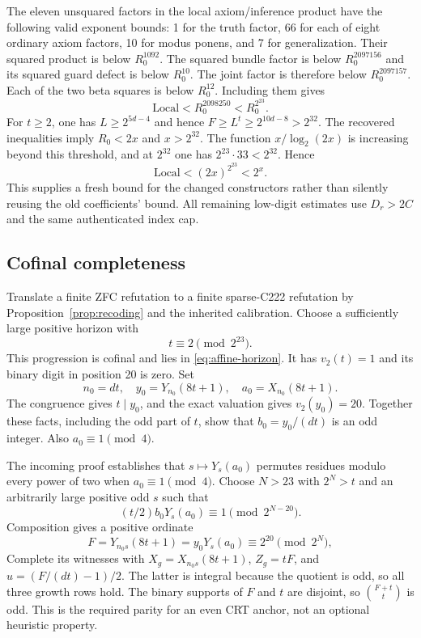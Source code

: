 \documentclass[11pt,letterpaper]{article}
\theoremstyle{remark}\newtheorem{remark}[theorem]{Remark}
\begin{document}
The eleven unsquared factors in the local axiom/inference product have
the following valid exponent bounds: 1 for the truth factor, 66 for
each of eight ordinary axiom factors, 10 for modus ponens, and 7 for
generalization. Their squared product is below $R_0^{1092}$. The
squared bundle factor is below $R_0^{2097156}$ and its squared guard
defect is below $R_0^{10}$. The joint factor is therefore below
$R_0^{2097157}$. Each of the two beta squares is below $R_0^{12}$.
Including them gives
\[
 \mathrm{Local}<R_0^{2098250}<R_0^{2^{23}}.
\]
For $t\ge2$, one has $L\ge2^{5d-4}$ and hence
$F\ge L^t\ge2^{10d-8}>2^{32}$. The recovered inequalities imply
$R_0<2x$ and $x>2^{32}$. The function
$x/\log_2(2x)$ is increasing beyond this threshold, and at $2^{32}$
one has $2^{23}\cdot33<2^{32}$. Hence
\[
 \mathrm{Local}<(2x)^{2^{23}}<2^x.
\]
This supplies a fresh bound for the changed constructors rather than
silently reusing the old coefficients' bound. All remaining low-digit
estimates use $D_r>2C$ and the same authenticated index cap.

\subsection{Cofinal completeness}

Translate a finite ZFC refutation to a finite sparse-C222 refutation by
Proposition~\ref{prop:recoding} and the inherited calibration. Choose
a sufficiently large positive horizon with
\[
 t\equiv2\pmod{2^{23}}.
\]
This progression is cofinal and lies in \eqref{eq:affine-horizon}.
It has $v_2(t)=1$ and its binary digit in position 20 is zero. Set
\[
 n_0=dt,\quad y_0=Y_{n_0}(8t+1),\quad
 a_0=X_{n_0}(8t+1).
\]
The congruence gives $t\mid y_0$, and the exact valuation gives
$v_2(y_0)=20$. Together these facts, including the odd part of $t$,
show that $b_0=y_0/(dt)$ is an odd integer. Also $a_0\equiv1\pmod4$.

The incoming proof establishes that $s\mapsto Y_s(a_0)$ permutes
residues modulo every power of two when $a_0\equiv1\pmod4$.
Choose $N>23$ with $2^N>t$ and an arbitrarily large positive odd $s$
such that
\[
 (t/2)b_0Y_s(a_0)\equiv1\pmod{2^{N-20}}.
\]
Composition gives a positive ordinate
\[
 F=Y_{n_0s}(8t+1)=y_0Y_s(a_0)
       \equiv2^{20}\pmod{2^N},
\]
Complete its witnesses with
$X_g=X_{n_0s}(8t+1)$, $Z_g=tF$, and $u=(F/(dt)-1)/2$.
The latter is integral because the quotient is odd, so all three growth
rows hold. The binary supports of $F$ and
$t$ are disjoint, so $\binom{F+t}{t}$ is odd. This is the required
parity for an even CRT anchor, not an optional heuristic property.
\end{document}

